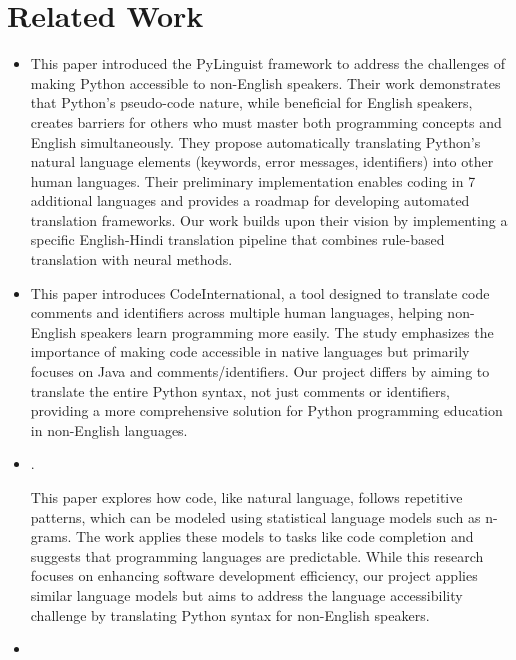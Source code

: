 \documentclass[11pt,a4paper]{article}
\begin{document}
\section{Related Work}
\begin{itemize}
  \item \cite{otten-etal-23-unipy}
  
  This paper introduced the PyLinguist framework to address the challenges of making Python accessible to non-English speakers. Their work demonstrates that Python's pseudo-code nature, while beneficial for English speakers, creates barriers for others who must master both programming concepts and English simultaneously. They propose automatically translating Python's natural language elements (keywords, error messages, identifiers) into other human languages. Their preliminary implementation enables coding in 7 additional languages and provides a roadmap for developing automated translation frameworks. Our work builds upon their vision by implementing a specific English-Hindi translation pipeline that combines rule-based translation with neural methods.
  \item \cite{Piech2019HumanLI}
  
  This paper introduces CodeInternational, a tool designed to translate code comments and identifiers across multiple human languages, helping non-English speakers learn programming more easily. The study emphasizes the importance of making code accessible in native languages but primarily focuses on Java and comments/identifiers. Our project differs by aiming to translate the entire Python syntax, not just comments or identifiers, providing a more comprehensive solution for Python programming education in non-English languages.
  
  \item \cite{10.5555/2819009.2819097}. 
  
  This paper explores how code, like natural language, follows repetitive patterns, which can be modeled using statistical language models such as n-grams. The work applies these models to tasks like code completion and suggests that programming languages are predictable. While this research focuses on enhancing software development efficiency, our project applies similar language models but aims to address the language accessibility challenge by translating Python syntax for non-English speakers. 
  
  \item \cite{10.1145/3196398.3196402}
  

\end{itemize}
\end{document}
